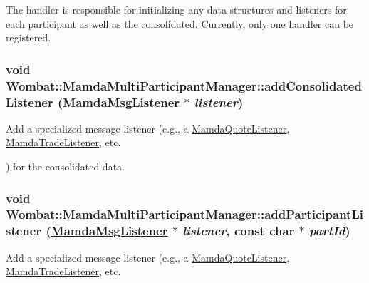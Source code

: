 The handler is responsible for initializing any data structures and listeners for each participant as well as the consolidated. Currently, only one handler can be registered. \hypertarget{classWombat_1_1MamdaMultiParticipantManager_37997b38e78d2c76f470738087a0cb34}{
\subsubsection[addConsolidatedListener]{\setlength{\rightskip}{0pt plus 5cm}void Wombat::Mamda\-Multi\-Participant\-Manager::add\-Consolidated\-Listener (\hyperlink{classWombat_1_1MamdaMsgListener}{Mamda\-Msg\-Listener} $\ast$ {\em listener})}}
\label{classWombat_1_1MamdaMultiParticipantManager_37997b38e78d2c76f470738087a0cb34}


Add a specialized message listener (e.g., a \hyperlink{classWombat_1_1MamdaQuoteListener}{Mamda\-Quote\-Listener}, \hyperlink{classWombat_1_1MamdaTradeListener}{Mamda\-Trade\-Listener}, etc. 

) for the consolidated data. \hypertarget{classWombat_1_1MamdaMultiParticipantManager_296f3ce08825ffaa6997a6c5fb67c496}{
\subsubsection[addParticipantListener]{\setlength{\rightskip}{0pt plus 5cm}void Wombat::Mamda\-Multi\-Participant\-Manager::add\-Participant\-Listener (\hyperlink{classWombat_1_1MamdaMsgListener}{Mamda\-Msg\-Listener} $\ast$ {\em listener}, const char $\ast$ {\em part\-Id})}}
\label{classWombat_1_1MamdaMultiParticipantManager_296f3ce08825ffaa6997a6c5fb67c496}


Add a specialized message listener (e.g., a \hyperlink{classWombat_1_1MamdaQuoteListener}{Mamda\-Quote\-Listener}, \hyperlink{classWombat_1_1MamdaTradeListener}{Mamda\-Trade\-Listener}, etc. 

